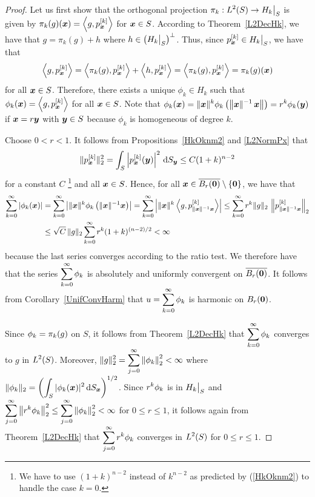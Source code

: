 \begin{proof}
Let us first show that the orthogonal projection
$\displaystyle \pi_k:L^2(S) \to H_k\big|_S$ is
given by $\displaystyle \pi_k(g)({\bm{x}}) = \left\langle{g} , {p_{{\bm{x}}}^{[k]}}\right\rangle$
for ${\bm{x}} \in S$.
According to Theorem~\ref{L2DecHk}, we have that $g = \pi_k(g) + h$
where $\displaystyle h \in \left(H_k\big|_S\right)^\perp$.  Thus, since
$\displaystyle p_{{\bm{x}}}^{[k]} \in H_k\big|_S$, we have that
\[
\left\langle{g} , {p_{{\bm{x}}}^{[k]}}\right\rangle = \left\langle{\pi_k(g)} , {p_{{\bm{x}}}^{[k]}}\right\rangle
+ \left\langle{h} , {p_{{\bm{x}}}^{[k]}}\right\rangle
= \left\langle{\pi_k(g)} , {p_{{\bm{x}}}^{[k]}}\right\rangle = \pi_k(g)({\bm{x}})
\]
for all ${\bm{x}} \in S$.  Therefore, there exists a unique
$\phi_k \in H_k$ such that
$\displaystyle \phi_k({\bm{x}}) = \left\langle{g} , {p_{{\bm{x}}}^{[k]}}\right\rangle$
for all ${\bm{x}} \in S$.  Note that
$\displaystyle \phi_k({\bm{x}})
= \|{\bm{x}}\|^k \phi_k\left(\left\|{\bm{x}}\|^{-1} \, {\bm{x}}\right\|\right)
= r^k \phi_k({\bm{y}})$ if ${\bm{x}} = r {\bm{y}}$ with ${\bm{y}} \in S$
because $\phi_k$ is homogeneous of degree $k$.

 Choose $0 < r < 1$.  It follows from Propositions~\ref{HkOknm2} and
\ref{L2NormPx} that
\[
\|p_{{\bm{x}}}^{[k]}\|_2^2
= \int_S \left|p_{{\bm{x}}}^{[k]}({\bm{y}})\right|^2 \,\mathrm{d}{S}_{{\bm{y}}}
\leq C (1+k)^{n-2}
\]
for a constant $C$ \footnote{We have to use $(1+k)^{n-2}$ instead of
$k^{n-2}$ as predicted by (\ref{HkOknm2}) to handle the case $k=0$.}
and all ${\bm{x}} \in S$.  Hence, for all
${\bm{x}} \in \overline{B_r({\bm{0}})} \setminus\{{\bm{0}}\}$,
we have that
\begin{align*}
\sum_{k=0}^\infty \left| \phi_k({\bm{x}}) \right|
&= \sum_{k=0}^\infty \left| \|{\bm{x}}\|^k
\phi_k\left( \|{\bm{x}}\|^{-1}{\bm{x}}\right) \right|
=\sum_{k=0}^\infty \left| \|{\bm{x}}\|^k
\left\langle{g} , {p_{\|{\bm{x}}\|^{-1}{\bm{x}}}^{[k]}}\right\rangle \right|
\leq \sum_{k=0}^\infty r^k \|g\|_2\,
\left\|p_{\|{\bm{x}}\|^{-1}{\bm{x}}}^{[k]}\right\|_2 \\
&\leq \sqrt{C} \, \|g\|_2 \sum_{k=0}^\infty r^k (1+k)^{(n-2)/2}  < \infty
\end{align*}
because the last series converges according to the ratio test.
We therefore have that the series 
$\displaystyle \sum_{k=0}^\infty \phi_k$ is absolutely and uniformly
convergent on $\overline{B_r({\bm{0}})}$.  It follows from
Corollary~\ref{UnifConvHarm} that
$\displaystyle u = \sum_{k=0}^\infty \phi_k$ is
harmonic on $B_r({\bm{0}})$.

 Since $\displaystyle \phi_k = \pi_k(g)$ on $S$, it follows
from Theorem~\ref{L2DecHk} that
$\displaystyle \sum_{k=0}^\infty \phi_k$ converges to $g$ in
$\displaystyle L^2(S)$.  Moreover,
$\displaystyle \|g\|_2^2 = \sum_{j=0}^\infty \left\|\phi_k\right\|_2^2 < \infty$
where $\displaystyle \|\phi_k\|_2
= \left( \int_S |\phi_k({\bm{x}})|^2 \,\mathrm{d}{S}_{{\bm{x}}}\right)^{1/2}$.
Since $\displaystyle r^k\phi_k$ is in $\displaystyle H_k\big|_S$ and
$\displaystyle \sum_{j=0}^\infty \left\|r^k\phi_k\right\|_2^2
\leq \sum_{j=0}^\infty \left\|\phi_k\right\|_2^2 < \infty$ for
$0 \leq r \leq 1$, it follows again from Theorem~\ref{L2DecHk} that
$\displaystyle \sum_{j=0}^\infty r^k\phi_k$ converges in $\displaystyle L^2(S)$
for $0 \leq r \leq 1$.


\end{proof}
